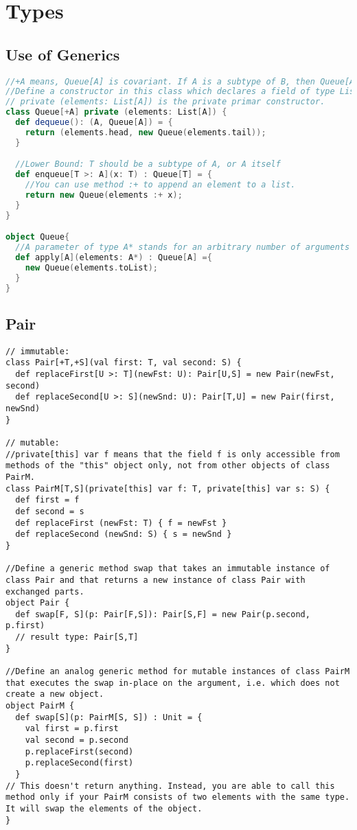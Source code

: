 \section{Types}

\subsection{Use of Generics}
\begin{lstlisting}[language=Scala]
//+A means, Queue[A] is covariant. If A is a subtype of B, then Queue[A] is also a subtype of Q[B]
//Define a constructor in this class which declares a field of type List[A] that can be used to set the element list. Lists of type List are immutable
// private (elements: List[A]) is the private primar constructor.
class Queue[+A] private (elements: List[A]) {
  def dequeue(): (A, Queue[A]) = {
    return (elements.head, new Queue(elements.tail));
  }

  //Lower Bound: T should be a subtype of A, or A itself
  def enqueue[T >: A](x: T) : Queue[T] = {
    //You can use method :+ to append an element to a list.
    return new Queue(elements :+ x);
  }
}

object Queue{
  //A parameter of type A* stands for an arbitrary number of arguments
  def apply[A](elements: A*) : Queue[A] ={
    new Queue(elements.toList);
  }
}
\end{lstlisting}

\clearpage
\subsection{Pair}
\begin{lstlisting}
// immutable:
class Pair[+T,+S](val first: T, val second: S) {
  def replaceFirst[U >: T](newFst: U): Pair[U,S] = new Pair(newFst, second)
  def replaceSecond[U >: S](newSnd: U): Pair[T,U] = new Pair(first, newSnd)
}

// mutable:
//private[this] var f means that the field f is only accessible from methods of the "this" object only, not from other objects of class PairM.
class PairM[T,S](private[this] var f: T, private[this] var s: S) {
  def first = f
  def second = s
  def replaceFirst (newFst: T) { f = newFst }
  def replaceSecond (newSnd: S) { s = newSnd }
}

//Define a generic method swap that takes an immutable instance of class Pair and that returns a new instance of class Pair with exchanged parts.
object Pair {
  def swap[F, S](p: Pair[F,S]): Pair[S,F] = new Pair(p.second, p.first)
  // result type: Pair[S,T]
}

//Define an analog generic method for mutable instances of class PairM that executes the swap in-place on the argument, i.e. which does not create a new object.
object PairM {
  def swap[S](p: PairM[S, S]) : Unit = {
    val first = p.first
    val second = p.second
    p.replaceFirst(second)
    p.replaceSecond(first)
  }
// This doesn't return anything. Instead, you are able to call this method only if your PairM consists of two elements with the same type. It will swap the elements of the object.
}
\end{lstlisting}

